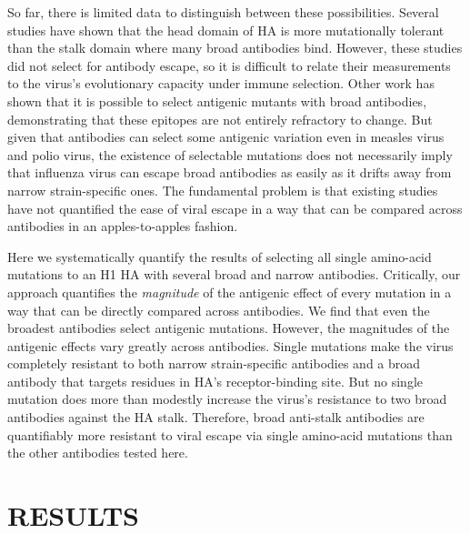 \documentclass[11pt]{article}
\begin{document}
So far, there is limited data to distinguish between these possibilities.
Several studies have shown that the head domain of HA is more mutationally tolerant than the stalk domain where many broad antibodies bind\cite{thyagarajan2014inherent,wu2014high,heaton2013genome}.
However, these studies did not select for antibody escape, so it is difficult to relate their measurements to the virus's evolutionary capacity under immune selection.
Other work has shown that it is possible to select antigenic mutants with broad antibodies\cite{yoshida2009cross,chai2016two,anderson2017natural}, demonstrating that these epitopes are not entirely refractory to change.
But given that antibodies can select some antigenic variation even in measles virus\cite{birrer1981antigenic,ter1981antigenic} and polio virus\cite{crainic1983natural,diamond1985antigenic}, the existence of selectable mutations does not necessarily imply that influenza virus can escape broad antibodies as easily as it drifts away from narrow strain-specific ones.
The fundamental problem is that existing studies have not quantified the ease of viral escape in a way that can be compared across antibodies in an apples-to-apples fashion.

Here we systematically quantify the results of selecting all single amino-acid mutations to an H1 HA with several broad and narrow antibodies.
Critically, our approach quantifies the \emph{magnitude} of the antigenic effect of every mutation in a way that can be directly compared across antibodies.
We find that even the broadest antibodies select antigenic mutations.
However, the magnitudes of the antigenic effects vary greatly across antibodies.
Single mutations make the virus completely resistant to both narrow strain-specific antibodies and a broad antibody that targets residues in HA's receptor-binding site.
But no single mutation does more than modestly increase the virus's resistance to two broad antibodies against the HA stalk.
Therefore, broad anti-stalk antibodies are quantifiably more resistant to viral escape via single amino-acid mutations than the other antibodies tested here. 

\section*{RESULTS}
\label{sec:results}
\end{document}
